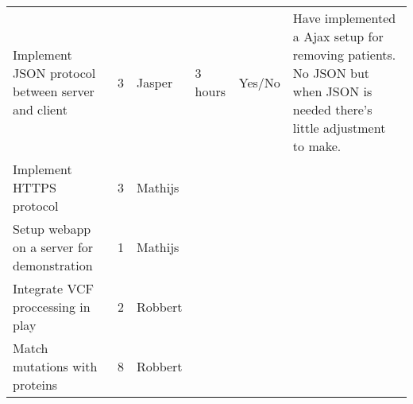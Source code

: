 \documentclass[a4paper]{report}
\begin{document}
\begin{landscape}
\begin{table}[ht]
\begin{tabular}{p{6cm}|l|l|l|p{2cm}|p{7cm}}
Implement JSON protocol between server and client & 3 & Jasper & 3 hours & Yes/No & Have implemented a Ajax setup for removing patients. No JSON but when JSON is needed there's little adjustment to make.\\
Implement HTTPS protocol & 3 & Mathijs & & & \\
Setup webapp on a server for demonstration & 1 & Mathijs & & & \\
Integrate VCF proccessing in play & 2 & Robbert & & & \\
Match mutations with proteins & 8 & Robbert & & & \\
\end{tabular}
\end{table}
\end{landscape}
\end{document}
